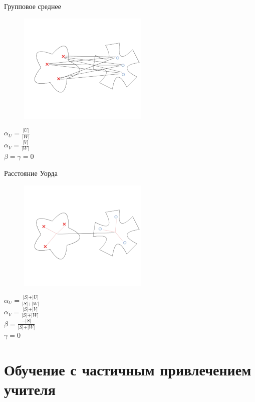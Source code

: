 \documentclass[10pt]{beamer}
\begin{document}
\begin{frame}{Групповое среднее}
	\begin{figure}[htbp]
	  \includegraphics[height=150pt, keepaspectratio = true]{images/lans3}  
	\end{figure}
	\pause
	${\alpha_U = \frac{\vert U \vert}{\vert W \vert}}$\\${\alpha_V = \frac{\vert V \vert}{\vert W \vert}}$ \\${\beta = \gamma = 0}$
\end{frame}

\begin{frame}{Расстояние Уорда}
	\begin{figure}[htbp]
	  \includegraphics[height=150pt, keepaspectratio = true]{images/lans4}  
	\end{figure}

  ${\alpha_U = \frac{\vert S \vert + \vert U \vert}{\vert S \vert + \vert W \vert}}$\\${\alpha_V = \frac{\vert S \vert + \vert V \vert}{\vert S \vert + \vert W \vert}}$ \\${\beta = \frac{ -\vert S \vert}{\vert S \vert + \vert W \vert}}$ \\${\gamma = 0}$
\end{frame}

\section{Обучение с частичным привлечением учителя}
\end{document}
